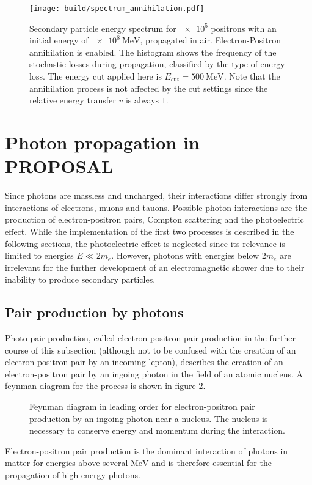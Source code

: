 \begin{figure}
    \centering
    \texttt{[image: build/spectrum\_annihilation.pdf]}
    \caption{Secondary particle energy spectrum for $\num{e5}$ positrons with an initial energy of $\SI{e8}{\mega\electronvolt}$, propagated in air. Electron-Positron annihilation is enabled. The histogram shows the frequency of the stochastic losses during propagation, classified by the type of energy loss. The energy cut applied here is $E_\text{cut} = \SI{500}{\mega\electronvolt}$. Note that the annihilation process is not affected by the cut settings since the relative energy transfer $v$ is always $1$.}
    \label{fig:spectrum_annihilation}
\end{figure}

\section{Photon propagation in PROPOSAL}

\label{sec:photonprop}

Since photons are massless and uncharged, their interactions differ strongly from interactions of electrons, muons and tauons.
Possible photon interactions are the production of electron-positron pairs, Compton scattering and the photoelectric effect.
While the implementation of the first two processes is described in the following sections, the photoelectric effect is neglected since its relevance is limited to energies $E \ll 2 m_e$.
However, photons with energies below $2 m_e$ are irrelevant for the further development of an electromagnetic shower due to their inability to produce secondary particles.

\subsection{Pair production by photons}

Photo pair production, called electron-positron pair production in the further course of this subsection (although not to be confused with the creation of an electron-positron pair by an incoming lepton), describes the creation of an electron-positron pair by an ingoing photon in the field of an atomic nucleus.
A feynman diagram for the process is shown in figure \ref{fig:feynman_photopair}.
%
\begin{figure}
    \centering
    
    \caption{Feynman diagram in leading order for electron-positron pair production by an ingoing photon near a nucleus. The nucleus is necessary to conserve energy and momentum during the interaction.}
    \label{fig:feynman_photopair}
\end{figure}
%
Electron-positron pair production is the dominant interaction of photons in matter for energies above several $\si{\mega\electronvolt}$ and is therefore essential for the propagation of high energy photons.

